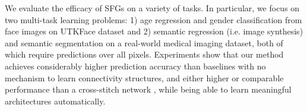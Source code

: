 We evaluate the efficacy of SFGs on a variety of tasks. In particular, we focus on two multi-task learning problems: 1) age regression and gender classification from face images on UTKFace dataset \cite{zhifei2017cvpr} and 2) semantic regression (i.e. image synthesis) and semantic segmentation on a real-world medical imaging dataset, both of which require predictions over all pixels. Experiments show that our method achieves considerably higher prediction accuracy than baselines with no mechanism to learn connectivity structures, and either higher or comparable performance than a cross-stitch network \cite{MisraCrossMTL16}, while being able to learn meaningful architectures automatically.









